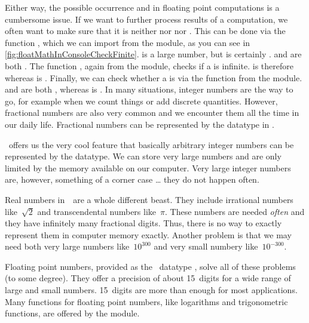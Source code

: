 Either way, the possible occurrence  and  in floating point computations is a cumbersome issue.
If we want to further process results of a computation, we often want to make sure that it is neither  nor  nor .
This can be done via the function , which we can import from the  module, as you can see in \cref{fig:floatMathInConsoleCheckFinite}.
 is a large number, but  is certainly .
 and  are both .
The function , again from the  module, checks if a  is infinite.
 is therefore  whereas  is .
Finally, we can check whether a  is  via the  function from the  module.
 and  are both , whereas  is .%
%
\endhsection%
%
%
%
In many situations, integer numbers are the way to go, for example when we count things or add discrete quantities.
However, fractional numbers are also very common and we encounter them all the time in our daily life.
Fractional numbers can be represented by the  datatype in \python.

\python\ offers us the very cool feature that basically arbitrary integer numbers can be represented by the  datatype.
We can store very large numbers and are only limited by the memory available on our computer.
Very large integer numbers are, however, something of a corner case {\dots} they do not happen often.

Real numbers in~\realNumbers\ are a whole different beast.
They include irrational numbers like~$\sqrt{2}$ and transcendental numbers like~$\pi$.
These numbers are needed \emph{often} and they have infinitely many fractional digits.
Thus, there is no way to exactly represent them in computer memory exactly.
Another problem is that we may need both very large numbers like~$10^{300}$ and very small numbery like~$10^{-300}$.

Floating point numbers, provided as the \python\ datatype , solve all of these problems (to some degree).
They offer a precision of about 15~digits for a wide range of large and small numbers.
15~digits are more than enough for most applications.
Many functions for floating point numbers, like logarithms and trigonometric functions, are offered by the  module.

